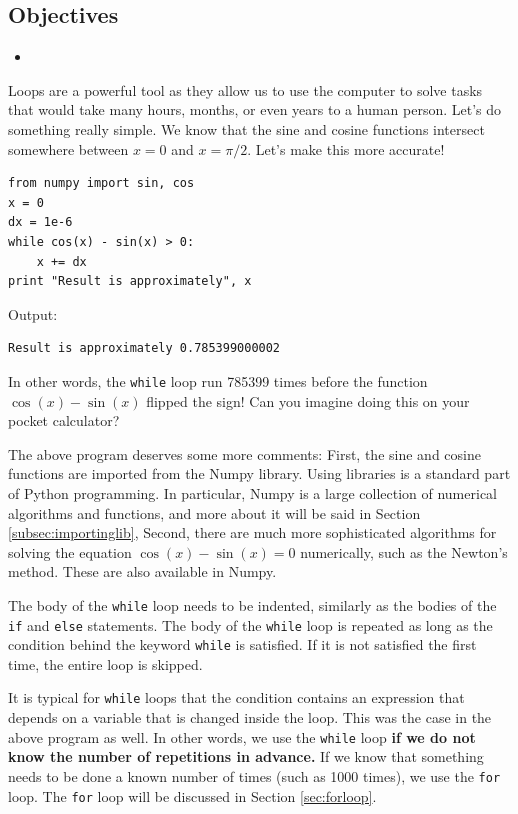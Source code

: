\subsection{Objectives}

\begin{itemize}
\item
\end{itemize}

Loops are a powerful tool as they allow us to use the computer to solve
tasks that would take many hours, months, or even years to a human person. 
Let's do something really simple. We know that the sine and cosine functions 
intersect somewhere between $x = 0$ and $x = \pi/2$. Let's make this more accurate!

\begin{verbatim}
from numpy import sin, cos
x = 0
dx = 1e-6
while cos(x) - sin(x) > 0:
    x += dx    
print "Result is approximately", x
\end{verbatim}
Output:

\begin{verbatim}
Result is approximately 0.785399000002
\end{verbatim}
In other words, the {\tt while} loop run 785399 times before 
the function $\cos(x) - \sin(x)$ flipped the sign! Can you 
imagine doing this on your pocket calculator?

The above program deserves some more comments: First, the sine and cosine 
functions are imported from the Numpy library. Using libraries 
is a standard part of Python programming. In particular, Numpy 
is a large collection of numerical algorithms and functions, and 
more about it will be said in Section \ref{subsec:importinglib},
Second, there are much more sophisticated algorithms for solving 
the equation $\cos(x) - \sin(x) = 0$ numerically, such as the Newton's 
method. These are also available in Numpy.

The body of the {\tt while} loop needs to be indented, similarly as
the bodies of the {\tt if} and {\tt else} statements. The body of
the {\tt while} loop
is repeated as long as the condition behind the keyword {\tt while}
is satisfied. If it is not satisfied the first time, the entire 
loop is skipped. 

It is typical for {\tt while} loops that the condition contains 
an expression that depends on a variable that is changed inside the 
loop. This was the case in the above program as well. In other 
words, we use the {\tt while} loop {\bf if we do not know the number of 
repetitions in advance.} If we know that something needs to be done
a known number of times (such as 1000 times), we use the {\tt for} loop.
The {\tt for} loop will be discussed in Section \ref{sec:forloop}.\\

